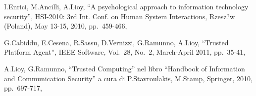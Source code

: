 


\begin{thebibliography}{9} %

I.Enrici, M.Ancilli, A.Lioy,
``A psychological approach to information technology security'',
HSI-2010: 3rd Int. Conf. on Human System Interactions,
Rzesz?w (Poland), May 13-15, 2010,
pp.\ 459-466,

G.Cabiddu, E.Cesena, R.Sassu, D.Vernizzi, G.Ramunno, A.Lioy,
``Trusted Platform Agent'',
IEEE Software,
Vol.\ 28, No.\ 2,
March-April 2011,
pp.\ 35-41,


A.Lioy, G.Ramunno, %
``Trusted Computing'' %
nel libro %
``Handbook of Information and Communication Security'' %
a cura di %
P.Stavroulakis, M.Stamp, %
Springer, %
2010, %
pp.\ 697-717, %


\end{thebibliography}
